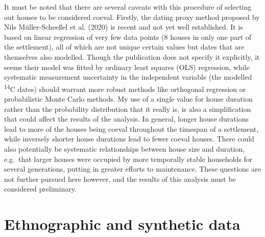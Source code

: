 \documentclass[
  12pt,
  a4paper, twoside]{book}
\begin{document}
It must be noted that there are several caveats with this procedure of selecting out houses to be considered coeval. Firstly, the dating proxy method proposed by Nils Müller-Scheeßel et al. (2020) is recent and not yet well established. It is based on linear regression of very few data points (8 houses in only one part of the settlement), all of which are not unique certain values but dates that are themselves also modelled. Though the publication does not specify it explicitly, it seems their model was fitted by ordinary least squares (OLS) regression, while systematic measurement uncertainty in the independent variable (the modelled \textsuperscript{14}C dates) should warrant more robust methods like orthogonal regression or probabilistic Monte Carlo methods. My use of a single value for house duration rather than the probability distribution that it really is, is also a simplification that could affect the results of the analysis. In general, longer house durations lead to more of the houses being coeval throughout the timespan of a settlement, while inversely shorter house durations lead to fewer coeval houses. There could also potentially be systematic relationships between house size and duration, e.g.~that larger houses were occupied by more temporally stable households for several generations, putting in greater efforts to maintenance. These questions are not further pursued here however, and the results of this analysis must be considered preliminary.

\hypertarget{ethnographic-and-synthetic-data}{%
\section{Ethnographic and synthetic data}\label{ethnographic-and-synthetic-data}}
\end{document}

